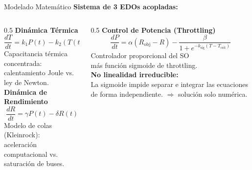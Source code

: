 \documentclass[aspectratio=169, 10pt]{beamer}
\newcommand{\tcrit}{T_{\text{crit}}}
\newcommand{\tamb}{T_{\text{amb}}}
\newcommand{\robj}{R_{\text{obj}}}
\begin{document}
\begin{frame}{Modelado Matemático}
  \textbf{Sistema de 3 EDOs acopladas:}\\[6pt]
  \begin{columns}[t]
    \begin{column}{0.5\textwidth}
      \textcolor{accent}{\small\textbf{Dinámica Térmica}}
      \begin{equation*}
        \frac{dT}{dt} = k_1 P(t) - k_2\!\left(T(t) - \tamb\right)
      \end{equation*}
      \scriptsize Capacitancia térmica concentrada:\\
      calentamiento Joule vs. ley de Newton.\\[8pt]

      \textcolor{accent}{\small\textbf{Dinámica de Rendimiento}}
      \begin{equation*}
        \frac{dR}{dt} = \gamma P(t) - \delta R(t)
      \end{equation*}
      \scriptsize Modelo de colas (Kleinrock):\\
      aceleración computacional vs. saturación de buses.
    \end{column}
    \begin{column}{0.5\textwidth}
      \textcolor{accent}{\small\textbf{Control de Potencia (Throttling)}}
      \begin{equation*}
        \frac{dP}{dt} = \alpha\!\left(\robj - R\right)
                       - \frac{\beta}{1+e^{-k_{\text{sig}}(T-\tcrit)}}
      \end{equation*}
      \scriptsize Controlador proporcional del SO\\ más función sigmoide de throttling.\\[8pt]

      \textcolor{warn}{\small\textbf{No linealidad irreducible:}}\\
      \scriptsize La sigmoide impide separar e integrar
      las ecuaciones de forma independiente.
      $\Rightarrow$ solución solo numérica.
    \end{column}
  \end{columns}
\end{frame}
\end{document}
